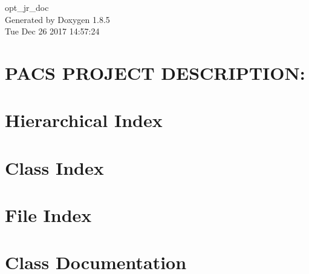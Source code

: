 \documentclass[twoside]{book}
\newcommand{\clearemptydoublepage}{%
  \newpage{\pagestyle{empty}\cleardoublepage}%
}
\begin{document}
\hypersetup{pageanchor=false}
\begin{titlepage}
\vspace*{7cm}
\begin{center}%
{\Large opt\-\_\-jr\-\_\-doc }\\
\vspace*{1cm}
{\large Generated by Doxygen 1.8.5}\\
\vspace*{0.5cm}
{\small Tue Dec 26 2017 14:57:24}\\
\end{center}
\end{titlepage}
\clearemptydoublepage
\tableofcontents
\clearemptydoublepage
{}
\hypersetup{pageanchor=true}

\chapter{P\-A\-C\-S P\-R\-O\-J\-E\-C\-T D\-E\-S\-C\-R\-I\-P\-T\-I\-O\-N\-:}
\label{md__vagrant_PROJECT_SPARK_PACS_PROJECT_README}
\hypertarget{md__vagrant_PROJECT_SPARK_PACS_PROJECT_README}{}

\chapter{Hierarchical Index}

\chapter{Class Index}

\chapter{File Index}

\chapter{Class Documentation}
















\end{document}
